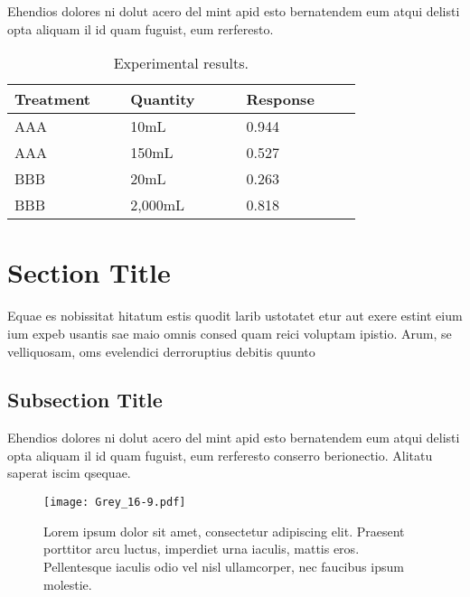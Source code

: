 \documentclass[
]{ImperialPoster}
\begin{document}
\begin{multicols}{3}
	Ehendios dolores ni dolut acero del mint apid esto bernatendem eum atqui delisti opta aliquam il id quam fuguist, eum rerferesto.

	\begin{table}[H] %
		\caption{Experimental results.}
		\begin{tabular}{L{0.26\linewidth} C{0.26\linewidth} R{0.26\linewidth}}
			\toprule
			Treatment & Quantity & Response\\
			\midrule
			AAA & 10mL & 0.944\\
			AAA & 150mL & 0.527\\
			BBB & 20mL & 0.263\\
			BBB & 2,000mL & 0.818\\
			\bottomrule
		\end{tabular}
	\end{table}

	\columnbreak{} %


	\section{Section Title}

	Equae es nobissitat hitatum estis quodit larib ustotatet etur aut exere estint eium ium expeb usantis sae maio omnis consed quam reici voluptam ipistio. Arum, se velliquosam, oms evelendici derroruptius debitis quunto

	\subsection{Subsection Title}

	Ehendios \textcolor{ICLBlue}{dolores} ni dolut acero del mint apid esto bernatendem eum \textcolor{ICLBlue}{atqui delisti opta} aliquam il id quam fuguist, eum rerferesto conserro berionectio. Alitatu saperat iscim qsequae.

	\vspace{0.017\textheight} %

	\begin{figure}[H] %
		\texttt{[image: Grey\_16-9.pdf]} %
		\parbox[b]{0.66\textwidth}{\caption{Lorem ipsum dolor sit amet, consectetur adipiscing elit. Praesent porttitor arcu luctus, imperdiet urna iaculis, mattis eros. Pellentesque iaculis odio vel nisl ullamcorper, nec faucibus ipsum molestie.}} %
	\end{figure}


\end{multicols}
\end{document}
